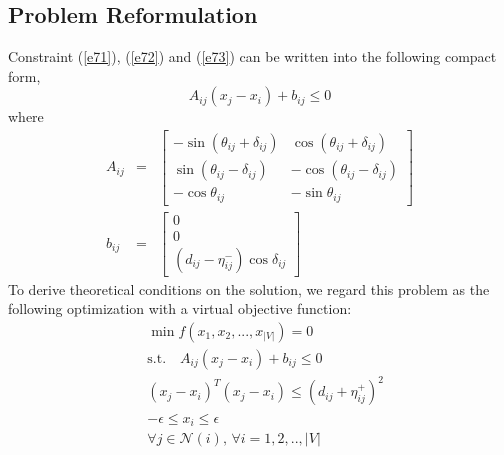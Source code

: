 \documentclass[journal]{IEEEtran}
\begin{document}
\subsection{Problem Reformulation}
Constraint (\ref{e71}), (\ref{e72}) and (\ref{e73}) can be written into the following compact form,
\begin{equation}\label{e8}
A_{ij}(x_j-x_i)+b_{ij}\leq 0
\end{equation}
where
\begin{eqnarray}
A_{ij}&=&\left[\begin{array}{cc}
-\sin(\theta_{ij}+\delta_{ij}) & \cos(\theta_{ij}+\delta_{ij})\\
\sin(\theta_{ij}-\delta_{ij}) &-\cos(\theta_{ij}-\delta_{ij})\\
-\cos\theta_{ij}& -\sin\theta_{ij}\end{array}\right]\\
b_{ij}&=&\left[\begin{array}{c}
0\\
0\\
(d_{ij}-\eta^-_{ij})\cos\delta_{ij}\end{array}\right]
\end{eqnarray}
To derive theoretical conditions on the solution, we regard this problem as the following  optimization with a virtual objective function:
\begin{subequations}\label{e9}
\begin{align}
&\min f(x_1, x_2, ..., x_{|V|})=0\label{e91}\\
&\text{s.t.}\quad A_{ij}(x_j-x_i)+b_{ij}\leq 0\label{e92}\\
&(x_j-x_i)^T(x_j-x_i) \leq (d_{ij}+\eta^+_{ij})^2\label{e93}\\
&-\epsilon\leq x_i\leq \epsilon\label{e94}\\
&\forall j\in\mathcal{N}(i),\,\forall i=1,2,..,|V|\nonumber
\end{align}
\end{subequations}
\end{document}
